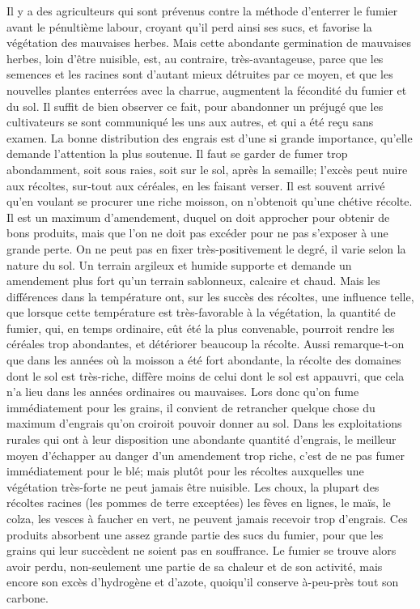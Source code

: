 Il y a des agriculteurs qui sont prévenus contre la méthode d'enterrer le fumier avant le pénultième labour, croyant qu'il perd ainsi ses sucs, et favorise la végétation des mauvaises herbes. Mais cette abondante germination de mauvaises herbes, loin d'être nuisible, est, au contraire, très-avantageuse, parce que les semences et les racines sont d'autant mieux détruites par ce moyen, et que les nouvelles plantes enterrées avec la charrue, augmentent la fécondité du fumier et du sol. Il suffit de bien observer ce fait, pour abandonner un préjugé que les cultivateurs se sont communiqué les uns aux autres, et qui a été reçu sans examen.
La bonne distribution des engrais est d'une\setcounter{page}{43} si grande importance, qu'elle demande l'attention la plus soutenue. Il faut se garder de fumer trop abondamment, soit sous raies, soit sur le sol, après la semaille; l'excès peut nuire aux récoltes, sur-tout aux céréales, en les faisant verser. Il est souvent arrivé qu'en voulant se procurer une riche moisson, on n'obtenoit qu'une chétive récolte. Il est un maximum d'amendement, duquel on doit approcher pour obtenir de bons produits, mais que l'on ne doit pas excéder pour ne pas s'exposer à une grande perte. On ne peut pas en fixer très-positivement le degré, il varie selon la nature du sol. Un terrain argileux et humide supporte et demande un amendement plus fort qu'un terrain sablonneux, calcaire et chaud. Mais les différences dans la température ont, sur les succès des récoltes, une influence telle, que lorsque cette température est très-favorable à la végétation, la quantité de fumier, qui, en temps ordinaire, eût été la plus convenable, pourroit rendre les céréales trop abondantes, et détériorer beaucoup la récolte. Aussi remarque-t-on que dans les années où la moisson a été fort abondante, la récolte des domaines dont le sol est très-riche, diffère moins de celui dont le sol est appauvri, que cela n'a lieu dans les années ordinaires\setcounter{page}{44} ou mauvaises. Lors donc qu'on fume immédiatement pour les grains, il convient de retrancher quelque chose du maximum d'engrais qu'on croiroit pouvoir donner au sol.
Dans les exploitations rurales qui ont à leur disposition une abondante quantité d'engrais, le meilleur moyen d'échapper au danger d'un amendement trop riche, c'est de ne pas fumer immédiatement pour le blé; mais plutôt pour les récoltes auxquelles une végétation très-forte ne peut jamais être nuisible. Les choux, la plupart des récoltes racines (les pommes de terre exceptées) les fèves en lignes, le maïs, le colza, les vesces à faucher en vert, ne peuvent jamais recevoir trop d'engrais. Ces produits absorbent une assez grande partie des sucs du fumier, pour que les grains qui leur succèdent ne soient pas en souffrance. Le fumier se trouve alors avoir perdu, non-seulement une partie de sa chaleur et de son activité, mais encore son excès d'hydrogène et d'azote, quoiqu'il conserve à-peu-près tout son carbone.
